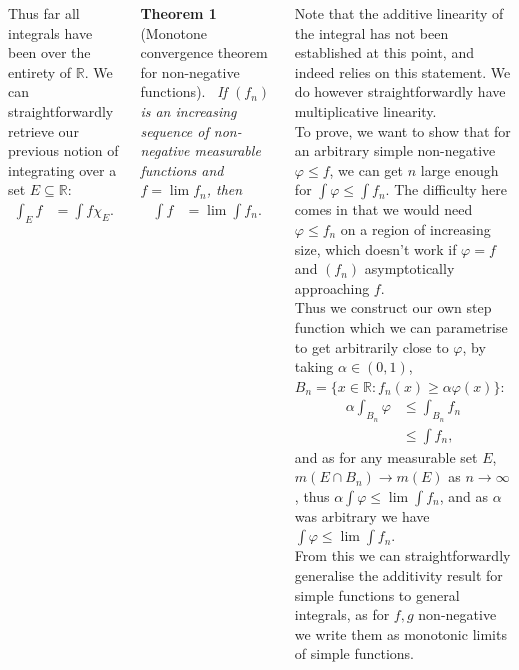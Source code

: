 \documentclass{tikzposter} %
\newtheorem{theorem}{Theorem}
\begin{document}
\begin{columns}
{    Thus far all integrals have been over the entirety of $\mathbb{R}$. We can straightforwardly retrieve our previous notion of integrating over a set $E \subseteq \mathbb{R}$:
    \begin{align*}
      \int_{E} f &= \int f \chi_{E}.
    \end{align*}
    \hphantom{}

    \begin{theorem}[Monotone convergence theorem for non-negative functions]
      \ If $(f_{n})$ is an increasing sequence of non-negative measurable functions and $f = \lim f_{n}$, then
      \begin{align*}
        \int f &= \lim \int f_{n}.
      \end{align*}
    \end{theorem}
    \hphantom{}

    Note that the additive linearity of the integral has not been established at this point, and indeed relies on this statement. We do however straightforwardly have multiplicative linearity. \\

    To prove, we want to show that for an arbitrary simple non-negative $\varphi \le f$, we can get $n$ large enough for $\int \varphi \le \int f_{n}$. The difficulty here comes in that we would need $\varphi \le f_{n}$ on a region of increasing size, which doesn't work if $\varphi = f$ and $(f_{n})$ asymptotically approaching $f$. \\

    Thus we construct our own step function which we can parametrise to get arbitrarily close to $\varphi$, by taking $\alpha \in (0,1)$, $B_{n} = \{x \in \mathbb{R} : f_{n}(x) \ge \alpha\varphi(x)\}$:
    \begin{align*}
      \alpha \int_{B_{n}} \varphi &\le \int_{B_{n}} f_{n} \\
                    &\le \int f_{n},
    \end{align*}
    and as for any measurable set $E$, $m(E \cap B_{n}) \to m(E)$ as $n \to \infty$, thus $\alpha \int \varphi \le \lim \int f_{n}$, and as $\alpha$ was arbitrary we have $\int \varphi \le \lim \int f_{n}$. \\

    From this we can straightforwardly generalise the additivity result for simple functions to general integrals, as for $f, g$ non-negative we write them as monotonic limits of simple functions. \\

}
\end{columns}
\end{document}
